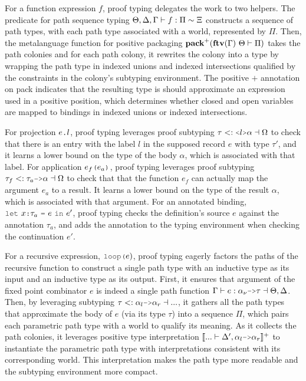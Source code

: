 \documentclass[acmsmall]{acmart}
\theoremstyle{definition}
\begin{document}
For a function expression $f$, proof typing 
delegates the work to two helpers. 
The predicate for path sequence typing 
$\Theta, \Delta, \Gamma \vdash f : \Pi \sim \Xi$
constructs a sequence of path types, 
with each path type associated with a world, represented by $\Pi$.
Then, the metalanguage function for positive packaging 
$\textbf{pack}^+(\textbf{ftv}(\Gamma)\ \Theta \vdash \Pi)$
takes the path colonies and for each path colony,
it rewrites the colony into a type by wrapping the path type in indexed unions
and indexed intersections qualified by the constraints in the colony's subtyping environment. 
The positive $+$ annotation on pack indicates that the resulting type 
is should approximate an expression used in a positive position,
which determines whether closed and open variables are mapped to
bindings in indexed unions or indexed intersections.

For projection $e\J{.}l$, proof typing
leverages proof subtyping $\tau \subtypes \J{<}l\J{>}\alpha \given \Omega$ 
to check that there is an entry with the label $l$ 
in the supposed record $e$ with type $\tau'$, 
and it learns a lower bound 
on the type of the body $\alpha$, which is associated with that label.
For application $e_f\J{(}e_a\J{)}$, proof typing
leverages proof subtyping $\tau_f \subtypes \tau_a \J{->} \alpha \given \Omega$
to check that that the function $e_f$ can actually
map the argument $e_a$ to a result. It learns a lower bound 
on the type of the result $\alpha$, which is associated with that argument.
For an annotated binding, $\J{let}\ x \J{:} \tau_a\ \J{=}\ e\ \J{in}\ e'$, 
proof typing checks the definition's source $e$ against the annotation $\tau_a$,
and adds the annotation to the typing environment when checking the continuation $e'$.

For a recursive expression, $\J{loop(}e{)}$, proof typing
eagerly factors the paths of the recursive function 
to construct a single path type with an inductive type as its input and an inductive type as its output. 
First, it ensures that argument of the fixed point combinator $e$ is indeed a 
single path function $\Gamma \entails e \hastype \alpha_\nu \J{->} \tau \given \Theta, \Delta$. 
Then, by leveraging subtyping $\tau \subtypes \alpha_l \J{->} \alpha_r \given ...$, 
it gathers all the path types that approximate the body of $e$ (via its type $\tau$)
into a sequence $\Pi$, which pairs each parametric path type with a world to qualify its meaning.
As it collects the path colonies, it leverages positive type interpretation 
$\llbracket ... \entails \Delta', \alpha_l \J{->} \alpha_r \rrbracket^+$ 
to instantiate the parametric path type with interpretations consistent with its corresponding world. 
This interpretation makes the path type more readable and the subtyping environment more compact.
\end{document}
